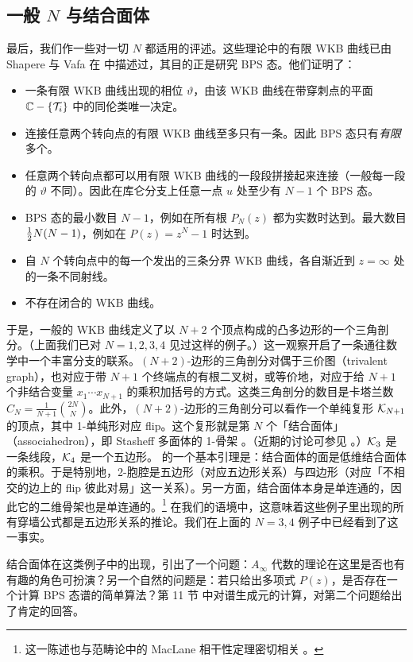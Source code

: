 \subsection{一般 $N$ 与结合面体}

最后，我们作一些对一切 $N$ 都适用的评述。这些理论中的有限 WKB 曲线已由 Shapere 与 Vafa 在 \cite{Shapere:1999xr} 中描述过，其目的正是研究 BPS 态。他们证明了：

\begin{itemize}
\item 一条有限 WKB 曲线出现的相位 $\vartheta$，由该 WKB 曲线在带穿刺点的平面 $\mathbb{C} - \{ \mathcal{T}_i \}$ 中的同伦类唯一决定。

\item 连接任意两个转向点的有限 WKB 曲线至多只有一条。因此 BPS 态只有\emph{有限}多个。

\item 任意两个转向点都可以用有限 WKB 曲线的一段段拼接起来连接（一般每一段的 $\vartheta$ 不同）。因此在库仑分支上任意一点 $u$ 处至少有 $N-1$ 个 BPS 态。

\item BPS 态的最小数目 $N-1$，例如在所有根 $P_N(z)$ 都为实数时达到。最大数目 $\tfrac{1}{2} N (N-1)$，例如在 $P(z) = z^N-1$ 时达到。

\item 自 $N$ 个转向点中的每一个发出的三条分界 WKB 曲线，各自渐近到 $z=\infty$ 处的一条不同射线。

\item 不存在闭合的 WKB 曲线。
\end{itemize}

于是，一般的 WKB 曲线定义了以 $N+2$ 个顶点构成的凸多边形的一个三角剖分。（上面我们已对 $N = 1, 2, 3, 4$ 见过这样的例子。）这一观察开启了一条通往数学中一个丰富分支的联系。$(N+2)$-边形的三角剖分对偶于三价图（trivalent graph），也对应于带 $N+1$ 个终端点的有根二叉树，或等价地，对应于给 $N+1$ 个非结合变量 $x_1 \cdots x_{N+1}$ 的乘积加括号的方式。这类三角剖分的数目是卡塔兰数 $C_N = \frac{1}{N+1} \binom{2N}{N}$。此外，$(N+2)$-边形的三角剖分可以看作一个单纯复形 $\mathcal{K}_{N+1}$ 的顶点，其中 1-单纯形对应 flip。这个复形就是第 $N$ 个「结合面体」（associahedron），即 Stasheff 多面体的 1-骨架 \cite{MR0158400}。（近期的讨论可参见 \cite{Lee,MR1841954}。）$\mathcal{K}_3$ 是一条线段，$\mathcal{K}_4$ 是一个五边形。\cite{MR0158400} 的一个基本引理是：结合面体的面是低维结合面体的乘积。于是特别地，2-胞腔是五边形（对应五边形关系）与四边形（对应「不相交的边上的 flip 彼此对易」这一关系）。另一方面，结合面体本身是单连通的，因此它的二维骨架也是单连通的。\footnote{这一陈述也与范畴论中的 MacLane 相干性定理密切相关 \cite{MR0330253}。} 在我们的语境中，这意味着这些例子里出现的所有穿墙公式都是五边形关系的推论。我们在上面的 $N=3,4$ 例子中已经看到了这一事实。

结合面体在这类例子中的出现，引出了一个问题：$A_\infty$ 代数的理论在这里是否也有有趣的角色可扮演？另一个自然的问题是：若只给出多项式 $P(z)$，是否存在一个计算 BPS 态谱的简单算法？第 11 节%
中对谱生成元的计算，对第二个问题给出了肯定的回答。
